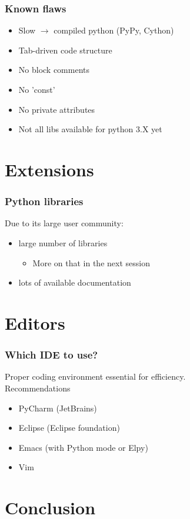\documentclass[14pt]{beamer}
\begin{document}
\begin{frame}
\frametitle{Known flaws}
\begin{itemize}
\item Slow $\rightarrow$ compiled python (PyPy, Cython)
\item Tab-driven code structure
\item No block comments
\item No 'const'
\item No private attributes
\item Not all libs available for python 3.X yet
\end{itemize}
\end{frame}

\section{Extensions}

\begin{frame}
\frametitle{Python libraries}
Due to its large user community:
\begin{itemize}
\item large number of libraries
\begin{itemize}
\item More on that in the next session
\end{itemize}
\item lots of available documentation
\end{itemize}
\end{frame}

\section{Editors}
\begin{frame}
\frametitle{Which IDE to use?}
\alert{Proper coding environment essential for efficiency.}\\
Recommendations
\begin{itemize}
\item PyCharm (JetBrains)
\item Eclipse (Eclipse foundation)
\item Emacs (with Python mode or Elpy)
\item Vim
\end{itemize}
\end{frame}

\section{Conclusion}
\end{document}
